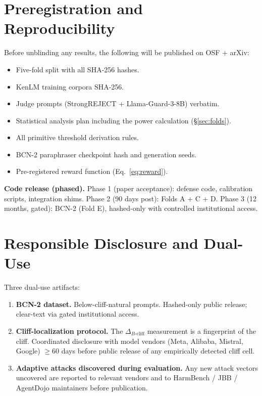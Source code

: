 \documentclass[11pt,a4paper]{article}
\newcommand{\bcliff}{\Delta_{B\text{-cliff}}}
\begin{document}
\section{Preregistration and Reproducibility}
\label{sec:preregistration}

Before unblinding any results, the following will be published on OSF + arXiv:

\begin{itemize}[leftmargin=2em, itemsep=2pt]
  \item Five-fold split with all SHA-256 hashes.
  \item KenLM training corpora SHA-256.
  \item Judge prompts (StrongREJECT + Llama-Guard-3-8B) verbatim.
  \item Statistical analysis plan including the power calculation (\S\ref{sec:folds}).
  \item All primitive threshold derivation rules.
  \item BCN-2 paraphraser checkpoint hash and generation seeds.
  \item Pre-registered reward function (Eq.~\ref{eq:reward}).
\end{itemize}

\textbf{Code release (phased).}
Phase 1 (paper acceptance): defense code, calibration scripts, integration shims.
Phase 2 (90 days post): Folds A + C + D.
Phase 3 (12 months, gated): BCN-2 (Fold E), hashed-only with controlled institutional access.

\section{Responsible Disclosure and Dual-Use}
\label{sec:disclosure}

Three dual-use artifacts:

\begin{enumerate}[leftmargin=2em, itemsep=3pt]
  \item \textbf{BCN-2 dataset.} Below-cliff-natural prompts.
        Hashed-only public release; clear-text via gated institutional access.
  \item \textbf{Cliff-localization protocol.} The $\bcliff$ measurement is a
        fingerprint of the cliff.
        Coordinated disclosure with model vendors (Meta, Alibaba, Mistral, Google)
        $\ge 60$ days before public release of any empirically detected cliff cell.
  \item \textbf{Adaptive attacks discovered during evaluation.} Any new attack vectors
        uncovered are reported to relevant vendors and to HarmBench / JBB / AgentDojo
        maintainers before publication.
\end{enumerate}
\end{document}
